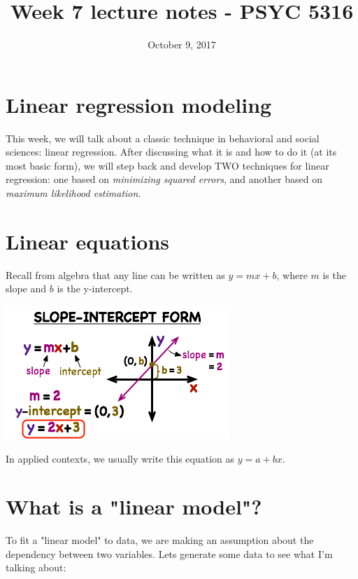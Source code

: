 \documentclass[11pt]{article}
\date{October 9, 2017}
\title{Week 7 lecture notes - PSYC 5316}
\begin{document}
\maketitle

\section*{Linear regression modeling}
\label{sec-1}

This week, we will talk about a classic technique in behavioral and social sciences: linear regression.  After discussing what it is and how to do it (at its most basic form), we will step back and develop TWO techniques for linear regression: one based on \emph{minimizing squared errors}, and another based on \emph{maximum likelihood estimation}.

\section*{Linear equations}
\label{sec-2}

Recall from algebra that any line can be written as $y=mx+b$, where $m$ is the slope and $b$ is the y-intercept.

\includegraphics[width=.9\linewidth]{figures/week7/slopeIntercept.png}

In applied contexts, we usually write this equation as $y=a+bx$.  

\section*{What is a "linear model"?}
\label{sec-3}

To fit a "linear model" to data, we are making an assumption about the dependency between two variables.  Lets generate some data to see what I'm talking about:
\end{document}
